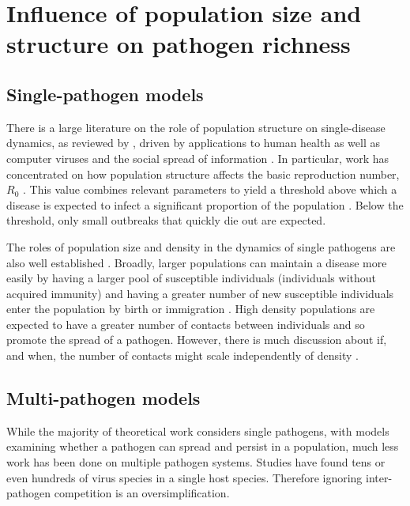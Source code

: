 \section{Influence of population size and structure on pathogen richness}



\subsection{Single-pathogen models}

There is a large literature on the role of population structure on single-disease dynamics, as reviewed by \textcite{pastor2015epidemic}, driven by applications to human health as well as computer viruses \cite{pastor2001epidemic} and the social spread of information \cite{goffman1964generalization}.
In particular, work has concentrated on how population structure affects the basic reproduction number, $R_0$ \cite{colizza2007invasion, barthelemy2010fluctuation, wu2013threshold, may2001infection, pastor2001epidemic}. 
This value combines relevant parameters to yield a threshold above which a disease is expected to infect a significant proportion of the population \cite{may1979population, anderson1979population}.
Below the threshold, only small outbreaks that quickly die out are expected.

The roles of population size and density in the dynamics of single pathogens are also well established \cite{may1979population, anderson1979population, heesterbeek2002brief, lloyd2005should}.
Broadly, larger populations can maintain a disease more easily by having a larger pool of susceptible individuals (individuals without acquired immunity) and having a greater number of new susceptible individuals enter the population by birth or immigration \cite{may1979population, anderson1979population}.
High density populations are expected to have a greater number of contacts between individuals and so promote the spread of a pathogen.
However, there is much discussion about if, and when, the number of contacts might scale independently of density \cite{mccallum2001should}.

\subsection{Multi-pathogen models}
While the majority of theoretical work considers single pathogens, with models examining whether a pathogen can spread and persist in a population, much less work has been done on multiple pathogen systems.
Studies have found tens \cite{anthony2013strategy} or even hundreds \cite{anthony2015non} of virus species in a single host species.
Therefore ignoring inter-pathogen competition is an oversimplification.


